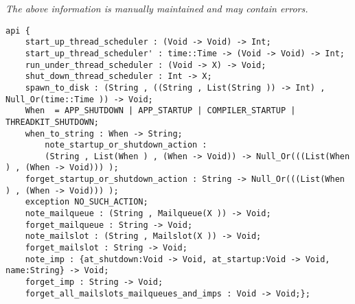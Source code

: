 \label{api:Thread\_Scheduler\_Control}

{\tiny \it The above information is manually maintained and may contain errors.}
\begin{verbatim}
api {
    start_up_thread_scheduler : (Void -> Void) -> Int;
    start_up_thread_scheduler' : time::Time -> (Void -> Void) -> Int;
    run_under_thread_scheduler : (Void -> X) -> Void;
    shut_down_thread_scheduler : Int -> X;
    spawn_to_disk : (String , ((String , List(String )) -> Int) , Null_Or(time::Time )) -> Void;
    When  = APP_SHUTDOWN | APP_STARTUP | COMPILER_STARTUP | THREADKIT_SHUTDOWN;
    when_to_string : When -> String;
        note_startup_or_shutdown_action :
        (String , List(When ) , (When -> Void)) -> Null_Or(((List(When ) , (When -> Void))) );
    forget_startup_or_shutdown_action : String -> Null_Or(((List(When ) , (When -> Void))) );
    exception NO_SUCH_ACTION;
    note_mailqueue : (String , Mailqueue(X )) -> Void;
    forget_mailqueue : String -> Void;
    note_mailslot : (String , Mailslot(X )) -> Void;
    forget_mailslot : String -> Void;
    note_imp : {at_shutdown:Void -> Void, at_startup:Void -> Void, name:String} -> Void;
    forget_imp : String -> Void;
    forget_all_mailslots_mailqueues_and_imps : Void -> Void;};
\end{verbatim}
